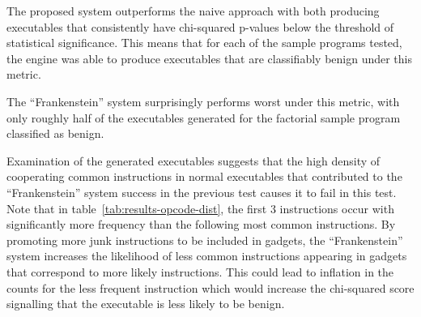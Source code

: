     The proposed system outperforms the naive approach with both producing
    executables that consistently have chi-squared p-values below the threshold
    of statistical significance. This means that for each of the sample
    programs tested, the engine was able to produce executables that are
    classifiably benign under this metric.

    The ``Frankenstein'' system surprisingly performs worst under this metric,
    with only roughly half of the executables generated for the factorial sample
    program classified as benign.

    Examination of the generated executables suggests that the high density of
    cooperating common instructions in normal executables that contributed to
    the ``Frankenstein'' system success in the previous test causes it to fail
    in this test. Note that in table~\ref{tab:results-opcode-dist}, the first 3
    instructions occur with significantly more frequency than the following most
    common instructions. By promoting more junk instructions to be included in
    gadgets, the ``Frankenstein'' system increases the likelihood of less common
    instructions appearing in gadgets that correspond to more likely
    instructions. This could lead to inflation in the counts for the less
    frequent instruction which would increase the chi-squared score signalling
    that the executable is less likely to be benign.


